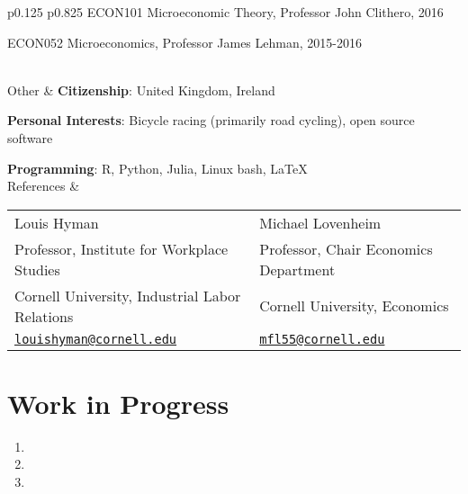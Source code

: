 \documentclass[letterpaper,11pt,oneside]{article}
\begin{document}
\begin{tabular}[\textwidth]{p{} p{}}
    ECON101 Microeconomic Theory, Professor John Clithero, 2016

    ECON052 Microeconomics, Professor James Lehman, 2015-2016

\\[25ex]
\Large{Other}
    & \textbf{Citizenship}: United Kingdom, Ireland
    
    \textbf{Personal Interests}: Bicycle racing (primarily road cycling), open source software
    
    \textbf{Programming}: R, Python, Julia, Linux bash, \LaTeX \vspace{0.2cm} \\

\Large{References}
    & \begin{tabular}[t]{@{} l l}
        Louis Hyman                                    & Michael Lovenheim                     \\
        Professor, Institute for Workplace Studies     & Professor, Chair Economics Department \\
        Cornell University, Industrial Labor Relations & Cornell University, Economics         \\
        \href{mailto:louishyman@cornell.edu}{\nolinkurl{louishyman@cornell.edu}}
            & \href{mailto:mfl55@cornell.edu}{\nolinkurl{mfl55@cornell.edu}}
    \end{tabular}
\end{tabular}

\newpage
\onehalfspacing
\restoregeometry
{}

\section*{Work in Progress}
\begin{enumerate}[itemsep=2.5pt, label={}]
    \item {}
    \item {}
    \item {}
\end{enumerate}

\end{document}
